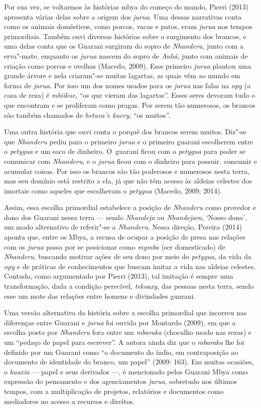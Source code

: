 Por sua vez, se voltarmos às histórias mbya do começo do mundo, Pierri
(2013) apresenta várias delas sobre a origem dos \emph{jurua}. Uma dessas
narrativas conta como os animais domésticos, como porcos, vacas e
patos, eram \emph{jurua} nos tempos primordiais. Também ouvi diversas
histórias sobre o surgimento dos brancos, e uma delas conta que os
Guarani surgiram do sopro de \emph{Nhanderu}, junto com a erva"-mate, enquanto
os \emph{jurua} nascem do sopro de \emph{Anhã}, junto com animais de criação como
porcos e ovelhas (Macedo, 2009). Esse primeiro \emph{jurua} plantou uma grande
árvore e nela criaram"-se muitas lagartas, as quais vêm ao mundo em
forma de \emph{jurua}. Por isso um dos nomes usados para os \emph{jurua} nas falas na
\emph{opy} (a casa de reza) é \emph{mbiikue}, ``os que vieram das lagartas''. Esses
seres devoram tudo o que encontram e se proliferam como pragas. Por
serem tão numerosos, os brancos são também chamados de \emph{hetava’e kuery},
``os muitos''.

Uma outra história que ouvi conta o porquê dos brancos serem muitos.
Diz"-se que \emph{Nhanderu} pediu para o primeiro \emph{jurua} e o primeiro guarani
escolherem entre o \emph{petygua} e um saco de dinheiro. O~guarani ficou
com o \emph{petygua} para poder se comunicar com \emph{Nhanderu}, e o \emph{jurua} ficou
com o dinheiro para possuir, consumir e acumular coisas. Por isso os
brancos são tão poderosos e numerosos nesta terra, mas seu domínio está
restrito a ela, já que não têm acesso às aldeias celestes dos imortais
como aqueles que escolheram o \emph{petygua} (Macedo, 2009; 2014). 

Assim, essa escolha primordial estabelece a posição de \emph{Nhanderu} como
provedor e dono dos Guarani nessa terra --- sendo \emph{Nhandeja} ou \emph{Nhandejara},
‘Nosso dono’, um modo alternativo de referir"-se a \emph{Nhanderu}. Nessa
direção, Pereira (2014) aponta que, entre os Mbya, a recusa de ocupar a
posição de presa nas relações com os \emph{jurua} passa por se posicionar como
\emph{mymba} (ser domesticado) de \emph{Nhanderu}, buscando motivar ações de seu dono
por meio do \emph{petygua}, da vida da \emph{opy} e de práticas de conhecimentos
que buscam imitar a vida nas aldeias celestes. Contudo, como
argumentado por Pierri (2013), tal imitação é sempre uma transformação,
dada a condição perecível, \emph{tekoaxy}, das pessoas nesta terra, sendo esse
um mote das relações entre homens e divindades guarani.


Uma versão alternativa da história sobre a escolha primordial que
incorreu nas diferenças entre Guarani e \emph{jurua} foi ouvida por Montardo
(2009), em que a escolha posta por \emph{Nhanderu} fora entre um \emph{mbaraka}
(chocalho usado nas rezas) e um ``pedaço de papel para escrever''. A
autora ainda diz que o \emph{mbaraka} lhe foi definido por um Guarani como ``o
documento do índio, em contraposição ao documento de identidade do
branco, um papel'' (2009: 163). Em muitas ocasiões, o \emph{kuaxia} --- papel e
seus derivados ---, é mencionado pelos Guarani Mbya como expressão do
pensamento e dos agenciamentos \emph{jurua}, sobretudo nos últimos tempos, com
a multiplicação de projetos, relatórios e documentos como mediadores no
acesso a recursos e direitos.

